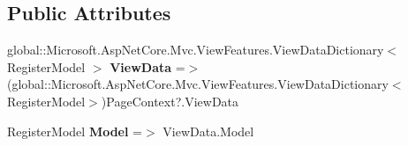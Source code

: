 \subsection*{Public Attributes}
\begin{DoxyCompactItemize}
\item 
\mbox{\label{class_projeto_e_s_w_1_1_areas_1_1_identity_1_1_pages_1_1_account_1_1_areas___identity___pages___account___register_a7d745788780236a4382d4df68371496c}} 
global\+::\+Microsoft.\+Asp\+Net\+Core.\+Mvc.\+View\+Features.\+View\+Data\+Dictionary$<$ Register\+Model $>$ {\bfseries View\+Data} =$>$ (global\+::\+Microsoft.\+Asp\+Net\+Core.\+Mvc.\+View\+Features.\+View\+Data\+Dictionary$<$Register\+Model$>$)Page\+Context?.View\+Data
\item 
\mbox{\label{class_projeto_e_s_w_1_1_areas_1_1_identity_1_1_pages_1_1_account_1_1_areas___identity___pages___account___register_a348d67d2cc08f1017dd4573596d2c0b4}} 
Register\+Model {\bfseries Model} =$>$ View\+Data.\+Model
\end{DoxyCompactItemize}
